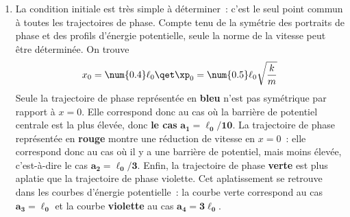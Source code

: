 \documentclass[a4paper, 12pt, final, garamond]{book}
\begin{document}
\begin{enumerate}
    \item La condition initiale est très simple à déterminer~: c'est le seul
        point commun à toutes les trajectoires de phase. Compte tenu de la
        symétrie des portraits de phase et des profils d'énergie potentielle,
        seule la norme de la vitesse peut être déterminée. On trouve
        \[
            x_0 = \num{0.4}\ell_0
            \qet
            \xp_0 = \num{0.5}\ell_0 \sqrt{\frac{k}{m}}
        \]
        Seule la trajectoire de phase représentée en \textbf{bleu} n'est pas
        symétrique par rapport à $x = 0$. Elle correspond donc au cas où la
        barrière de potentiel centrale est la plus élevée, donc \textbf{le cas}
        $\mathbf{a_1 = \ell_0/10}$. La trajectoire de phase représentée en
        \textbf{rouge} montre une réduction de vitesse en $x = 0$~: elle
        correspond donc au cas où il y a une barrière de potentiel, mais moins
        élevée, c'est-à-dire le cas $\mathbf{a_2 = \ell_0/3}$. Enfin, la
        trajectoire de phase \textbf{verte} est plus aplatie que la trajectoire
        de phase violette. Cet aplatissement se retrouve dans les courbes
        d'énergie potentielle~: la courbe verte correspond au cas $\mathbf{a_3 =
        \ell_0}$ et la courbe \textbf{violette} au cas $\mathbf{a_4 = 3\ell_0}$.
\end{enumerate}
\end{document}
